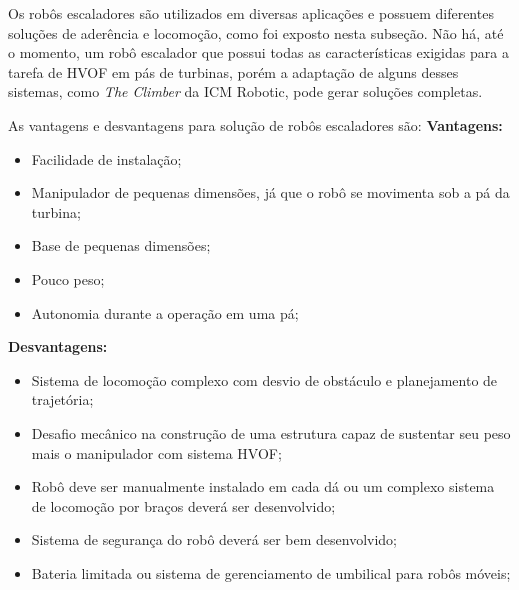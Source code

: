 Os robôs escaladores são utilizados em diversas aplicações e possuem diferentes
soluções de aderência e locomoção, como foi exposto nesta subseção. Não há,
até o momento, um robô escalador que possui todas as características
exigidas para a tarefa de HVOF em pás de turbinas, porém a adaptação de
alguns desses sistemas, como \emph{The Climber} da ICM Robotic, pode gerar
soluções completas.

As vantagens e desvantagens para solução de robôs escaladores são:
\textbf{Vantagens:}
\begin{itemize}
  \item Facilidade de instalação;
  \item Manipulador de pequenas dimensões, já que o robô se movimenta sob a pá
  da turbina;
  \item Base de pequenas dimensões;
  \item Pouco peso;
  \item Autonomia durante a operação em uma pá; 
\end{itemize}

\textbf{Desvantagens:}
\begin{itemize}
  \item Sistema de locomoção complexo com desvio de obstáculo e planejamento de
  trajetória;
  \item Desafio mecânico na construção de uma estrutura capaz de sustentar seu
  peso mais o manipulador com sistema HVOF;
  \item Robô deve ser manualmente instalado em cada dá ou um complexo sistema
  de locomoção por braços deverá ser desenvolvido;
  \item Sistema de segurança do robô deverá ser bem desenvolvido;
  \item Bateria limitada ou sistema de gerenciamento de umbilical para robôs
  móveis;
\end{itemize}